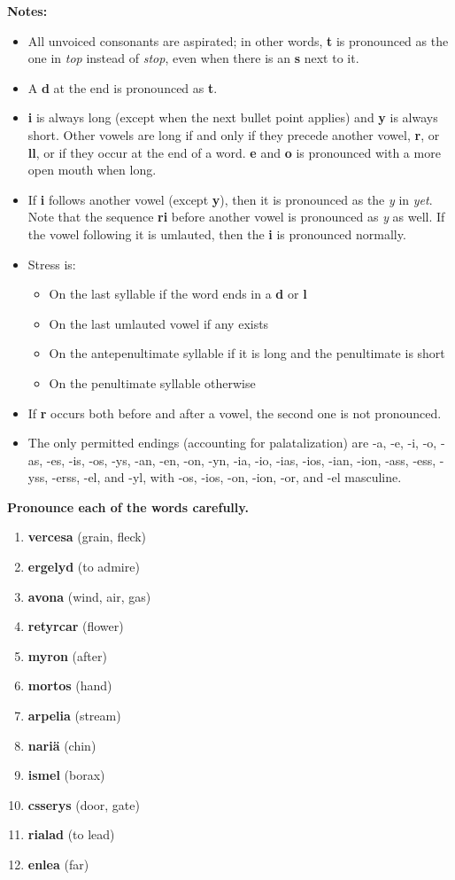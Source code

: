 \textbf{Notes:}

\begin{itemize}
  \item All unvoiced consonants are aspirated; in other words, \textbf{t} is pronounced as the one in \emph{top} instead of \emph{stop}, even when there is an \textbf{s} next to it.
  \item A \textbf{d} at the end is pronounced as \textbf{t}.
  \item \textbf{i} is always long (except when the next bullet point applies) and \textbf{y} is always short. Other vowels are long if and only if they precede another vowel, \textbf{r}, or \textbf{ll}, or if they occur at the end of a word. \textbf{e} and \textbf{o} is pronounced with a more open mouth when long.
  \item If \textbf{i} follows another vowel (except \textbf{y}), then it is pronounced as the \emph{y} in \emph{yet}. Note that the sequence \textbf{ri} before another vowel is pronounced as \emph{y} as well. If the vowel following it is umlauted, then the \textbf{i} is pronounced normally.
  \item Stress is:
  \begin{itemize}
    \item On the last syllable if the word ends in a \textbf{d} or \textbf{l}
    \item On the last umlauted vowel if any exists
    \item On the antepenultimate syllable if it is long and the penultimate is short
    \item On the penultimate syllable otherwise
  \end{itemize}
  \item If \textbf{r} occurs both before and after a vowel, the second one is not pronounced.
  \item The only permitted endings (accounting for palatalization) are -a, -e, -i, -o, -as, -es, -is, -os, -ys, -an, -en, -on, -yn, -ia, -io, -ias, -ios, -ian, -ion, -ass, -ess, -yss, -erss, -el, and -yl, with -os, -ios, -on, -ion, -or, and -el masculine.
\end{itemize}

\textbf{Pronounce each of the words carefully.}

\begin{enumerate}
  \item \textbf{vercesa} (grain, fleck)
  \item \textbf{ergelyd} (to admire)
  \item \textbf{avona} (wind, air, gas)
  \item \textbf{retyrcar} (flower)
  \item \textbf{myron} (after)
  \item \textbf{mortos} (hand)
  \item \textbf{arpelia} (stream)
  \item \textbf{nari\"a} (chin)
  \item \textbf{ismel} (borax)
  \item \textbf{csserys} (door, gate)
  \item \textbf{rialad} (to lead)
  \item \textbf{enlea} (far)
\end{enumerate}

